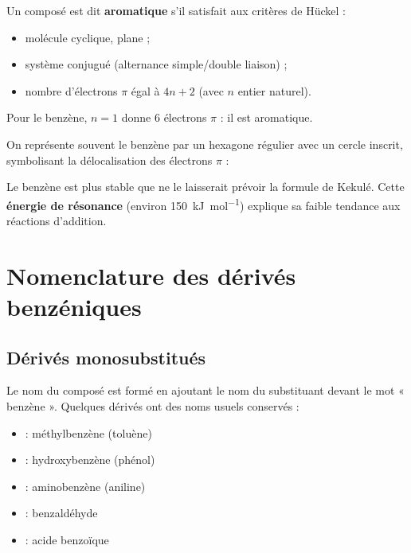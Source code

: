 \begin{definition}[Aromaticité]
Un composé est dit \textbf{aromatique} s'il satisfait aux critères de Hückel :
\begin{itemize}
    \item molécule cyclique, plane ;
    \item système conjugué (alternance simple/double liaison) ;
    \item nombre d'électrons $\pi$ égal à $4n+2$ (avec $n$ entier naturel).
\end{itemize}
Pour le benzène, $n=1$ donne $6$ électrons $\pi$ : il est aromatique.
\end{definition}

\begin{propriete}
On représente souvent le benzène par un hexagone régulier avec un cercle inscrit, symbolisant la délocalisation des électrons $\pi$ :
\begin{illus}
\end{illus}
\end{propriete}

\begin{aretenir}
Le benzène est plus stable que ne le laisserait prévoir la formule de Kekulé. Cette \textbf{énergie de résonance} (environ \SI{150}{\kilo\joule\per\mol}) explique sa faible tendance aux réactions d'addition.
\end{aretenir}

\section{Nomenclature des dérivés benzéniques}

\subsection{Dérivés monosubstitués}

Le nom du composé est formé en ajoutant le nom du substituant devant le mot « benzène ». Quelques dérivés ont des noms usuels conservés :

\begin{exemple}
\begin{itemize}
    \item {} : méthylbenzène (toluène)
    \item {} : hydroxybenzène (phénol)
    \item {} : aminobenzène (aniline)
    \item {} : benzaldéhyde
    \item {} : acide benzoïque
\end{itemize}
\end{exemple}

